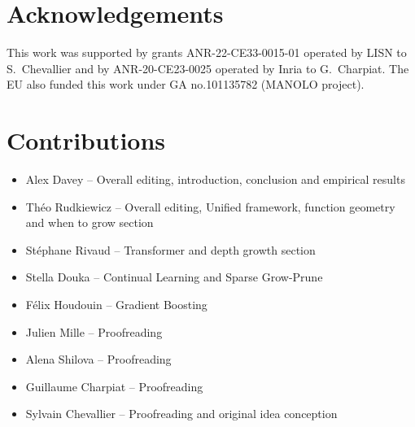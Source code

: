 \section*{Acknowledgements}

This work was supported by grants ANR-22-CE33-0015-01 operated by LISN to S.~Chevallier and by ANR-20-CE23-0025 operated by Inria to G.~Charpiat.
The EU also funded this work under GA no.101135782 (MANOLO project).

\section*{Contributions}

\begin{itemize}
    \item Alex Davey -- Overall editing, introduction, conclusion and empirical results
    \item Théo Rudkiewicz -- Overall editing, Unified framework, function geometry and when to grow section
    \item Stéphane Rivaud -- Transformer and depth growth section
    \item Stella Douka -- Continual Learning and Sparse Grow-Prune
    \item Félix Houdouin -- Gradient Boosting
    \item Julien Mille -- Proofreading
    \item Alena Shilova -- Proofreading
    \item Guillaume Charpiat -- Proofreading
    \item Sylvain Chevallier -- Proofreading and original idea conception
\end{itemize}
